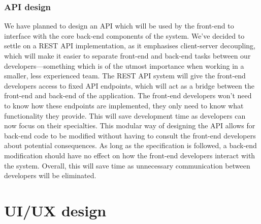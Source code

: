 \documentclass[10pt]{article}
\begin{document}
\subsubsection{API design}
We have planned to design an API which will be used by the front-end to
interface with the core back-end components of the system. We've decided to
settle on a REST API implementation, as it emphasises client-server decoupling,
which will make it easier to separate front-end and back-end tasks between our
developers—something which is of the utmost importance when working in a
smaller, less experienced team. The REST API system will give the front-end
developers access to fixed API endpoints, which will act as a bridge between the
front-end and back-end of the application. The front-end developers won't need
to know how these endpoints are implemented, they only need to know what
functionality they provide. This will save development time as developers can
now focus on their specialties. This modular way of designing the API allows for
back-end code to be modified without having to consult the front-end developers
about potential consequences. As long as the specification is followed, a
back-end modification should have no effect on how the front-end developers
interact with the system. Overall, this will save time as unnecessary
communication between developers will be eliminated.

\section{UI/UX design}
\end{document}
